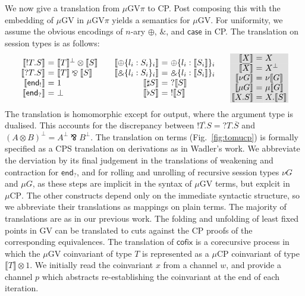 \documentclass[orivec,envcountsame]{llncs}
\makeatletter
\newcommand{\with}{\mathbin\binampersand}
\newcommand{\parr}{\mathbin\bindnasrepma}
\newcommand{\cpdual}[1]{#1^\perp}
\newcommand{\cpbang}[1]{{! #1}}
\newcommand{\cpquery}[1]{{? #1}}
\newcommand{\gvdual}[1]{\overline{#1}}
\newcommand{\gvout}[2]{{!#1.#2}}
\newcommand{\gvin}[2]{{?#1.#2}}
\newcommand{\outterm}{\mkwd{end}_!}
\newcommand{\interm}{\mkwd{end}_?}
\newcommand{\gvserver}[1]{\flat #1}
\newcommand{\gvservice}[1]{\sharp #1}
\newcommand{\mkwd}[1]{\mathsf{#1}}
\newcommand{\lrkwd}{\mkwd{cofix}}
\newcommand{\key}{\mkwd}
\newcommand{\cofix}{\lrkwd}
\newcommand{\tocp}[1]{\llbracket #1 \rrbracket}
\newcommand{\mucp}{$\mu\mathrm{CP}$\xspace}
\newcommand{\mugv}{$\mu\mathrm{GV}$\xspace}
\newcommand{\gvpi}{$\mu\mathrm{GV}\pi$\xspace}
\newcommand{\ba}{\begin{array}}
\newcommand{\ea}{\end{array}}
\newenvironment{eqs}{\ba{@{}r@{~}c@{~}l@{}}}{\ea}
\newcommand\shaderow{\noalign{\vskip-0.4pt}\rowcolor{shade}[0.6mm]}
\makeatother
\begin{document}
We now give a translation from \gvpi to CP. Post composing this with the embedding of \mugv in \gvpi
yields a semantics for \mugv. For uniformity, we assume the obvious encodings of $n$-ary $\oplus$,
$\with$, and $\key{case}$ in CP. The translation on session types is as follows:
\small\[
\ba{@{}c@{\qquad}c@{\qquad}c@{}}
\begin{eqs}
\tocp{\gvout{T}{S}}        &=& \cpdual{\tocp{T}} \otimes \tocp{S} \\
\tocp{\gvin{T}{S}}         &=& \tocp{T} \parr \tocp{S} \\
\tocp{\outterm}            &=& 1 \\
\tocp{\interm}             &=& \bot \\
\end{eqs}
&
\begin{eqs}
\tocp{\oplus \{l_i:S_i \}_i} &=& \oplus \{l_i:\tocp{S_i}\}_i \\
\tocp{\with \{l_i:S_i \}_i}  &=& \with \{l_i:\tocp{S_i}\}_i \\
\tocp{\gvservice{S}}       &=& \cpquery{\tocp{S}} \\
\tocp{\gvserver{S}}        &=& \cpbang{\tocp{S}} \\
\end{eqs}
&
\begin{eqs}\shaderow
\tocp{X}                   &=& X \\ \shaderow
\tocp{\gvdual{X}}          &=& \cpdual{X} \\ \shaderow
\tocp{\nu G}                &=& \nu\tocp{G} \\ \shaderow
\tocp{\mu G}                &=& \mu\tocp{G} \\ \shaderow
\tocp{X.S}                  &=& X.\tocp{S} \\
\end{eqs}\\
\ea
\]\normalsize
The translation is homomorphic except for output, where the argument type is dualised. This accounts
for the discrepancy between $\gvdual{\gvout{T}{S}} = \gvin{T}{\gvdual{S}}$ and $\cpdual{(A \otimes
  B)} = \cpdual{A} \parr \cpdual{B}.$
%
The translation on terms (Fig.~\ref{fig:tomucp}) is formally specified as a CPS translation on
derivations as in Wadler's work. We abbreviate the derviation by its final judgement in the
translations of weakening and contraction for $\interm$, and for rolling and unrolling of recursive
session types $\nu G$ and $\mu G$, as these steps are implicit in the syntax of \mugv terms, but
explcit in \mucp. The other constructs depend only on the immediate syntactic structure, so we
abbreviate their translations as mappings on plain terms. The majority of translations are as in our
previous work. The folding and unfolding of least fixed points in GV can be translated to cuts
against the CP proofs of the corresponding equivalences. The translation of $\cofix$ is a
corecursive process in which the \mugv coinvariant of type $T$ is represented as a \mucp coinvariant
of type $\tocp{T} \otimes 1$.  We initially read the coinvariant $x$ from a channel $w$, and provide
a channel $p$ which abstracts re-establishing the coinvariant at the end of each iteration.
\end{document}
